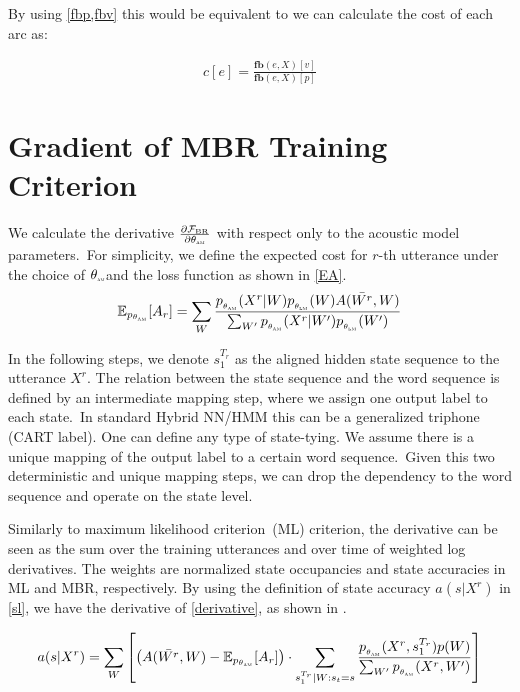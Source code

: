 \documentclass[a4paper,13.5pt]{extarticle}
\def\am{$\theta_{\scaleto{\text{AM}}{2pt}}$}
\begin{document}
	By using \cref{fbp,fbv} this would be equivalent to we can calculate the cost of each arc as:
	
	\begin{align}
		\label{ce}
		c[e] = \frac{\mathbf{fb}(e, X)[v]}{\mathbf{fb}(e, X)[p]}
	\end{align}
	
	
	\section{Gradient of MBR Training Criterion}
	
	We calculate the derivative $\frac{\partial\mathcal{F_{\text{BR}}}}{\partial \theta_{\scaleto{\text{AM}}{2pt}}}$ with respect only to the acoustic model parameters.\ For simplicity, we define the expected cost for $r$-th utterance under the choice of \am and the loss function as shown in \cref{EA}.
	\begin{align}
		\label{EA}
		\mathbb{E}_{p_\text{\am}}[A_r]= \sum_W \frac{p_{_{\theta_{\scaleto{\text{AM}}{2pt}}}}(X^r | W)p_{_{\theta_{\scaleto{\text{LM}}{2pt}}}}(W)  A(\bar{W^r}, W)}{\sum_{W^{\prime}} p_{_{\theta_{\scaleto{\text{AM}}{2pt}}}}(X^r | W^{\prime})p_{_{\theta_{\scaleto{\text{LM}}{2pt}}}}(W^{\prime})}
	\end{align}
	
	In the following steps, we denote ${s_1^{T_r}}$ as the aligned hidden state sequence to the utterance $X^r$. The relation between the state sequence and the word sequence is defined by an intermediate mapping step, where we assign one output label to each state.\ In standard Hybrid NN/HMM this can be a generalized triphone (CART label). One can define any type of state-tying. We assume there is a unique mapping of the output label to a certain word sequence.\ Given this two deterministic and unique mapping steps, we can drop the dependency to the word sequence and operate on the state level.
	
	Similarly to maximum likelihood criterion~(ML) criterion, the derivative can be seen as the sum over the training utterances and over time of weighted log derivatives. The weights are normalized state occupancies and state accuracies in ML and MBR, respectively. By using the definition of state accuracy $a(s|X^r)$ in \cref{sl}, we have the derivative of \cref{derivative}, as shown in \cite{hoffmeister2011wfst}.
	
	
	
	\begin{align}
		\label{sl}
		a(s|X^r)=  \sum_W  \left[ \left( A(\bar{W^r}, W) - \mathbb{E}_{p_\text{\am}}[A_r] \right) \cdot\sum_{s_1^{T_r}|W: s_t=s} \frac{p_{_{\theta_{\scaleto{\text{AM}}{2pt}}}}(X^r , s_1^{T_r})p(W)}{\sum_{W^{\prime}} p_{_{\theta_{\scaleto{\text{AM}}{2pt}}}}(X^r , W^{\prime})} \right]
	\end{align}
	
\end{document}
